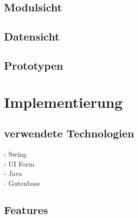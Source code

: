\subsection{Modulsicht}
\subsection{Datensicht}
\subsection{Prototypen}



\section{Implementierung}
\subsection{verwendete Technologien}
- Swing \\
- UI Form \\
- Java\\
- Gutenbase

\subsection{Features}


